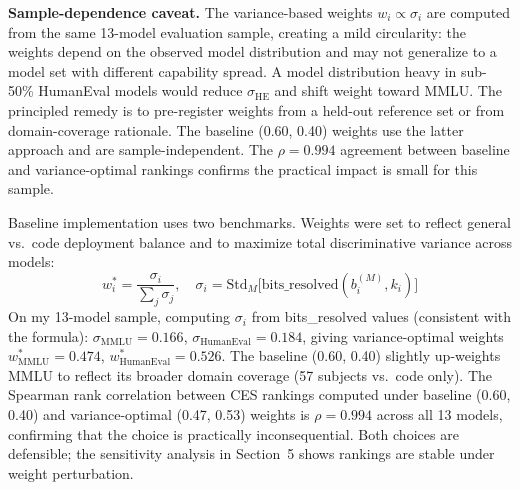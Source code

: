 \documentclass[12pt]{article}
\begin{document}
\textbf{Sample-dependence caveat.} The variance-based weights $w_i \propto \sigma_i$ are computed from the same 13-model evaluation sample, creating a mild circularity: the weights depend on the observed model distribution and may not generalize to a model set with different capability spread. A model distribution heavy in sub-50\% HumanEval models would reduce $\sigma_{\text{HE}}$ and shift weight toward MMLU. The principled remedy is to pre-register weights from a held-out reference set or from domain-coverage rationale. The baseline (0.60, 0.40) weights use the latter approach and are sample-independent. The $\rho = 0.994$ agreement between baseline and variance-optimal rankings confirms the practical impact is small for this sample.

Baseline implementation uses two benchmarks. Weights were set to reflect general vs.\ code deployment balance and to maximize total discriminative variance across models:
\begin{equation}
w_i^* = \frac{\sigma_i}{\sum_j \sigma_j}, \quad \sigma_i = \mathrm{Std}_{M}\bigl[\mathrm{bits\_resolved}(b_i^{(M)}, k_i)\bigr]
\end{equation}
On my 13-model sample, computing $\sigma_i$ from bits\_resolved values (consistent with the formula): $\sigma_{\text{MMLU}} = 0.166$, $\sigma_{\text{HumanEval}} = 0.184$, giving variance-optimal weights $w_{\text{MMLU}}^* = 0.474$, $w_{\text{HumanEval}}^* = 0.526$. The baseline (0.60, 0.40) slightly up-weights MMLU to reflect its broader domain coverage (57 subjects vs.\ code only). The Spearman rank correlation between CES rankings computed under baseline (0.60, 0.40) and variance-optimal (0.47, 0.53) weights is $\rho = 0.994$ across all 13 models, confirming that the choice is practically inconsequential. Both choices are defensible; the sensitivity analysis in Section~5 shows rankings are stable under weight perturbation.
\end{document}

